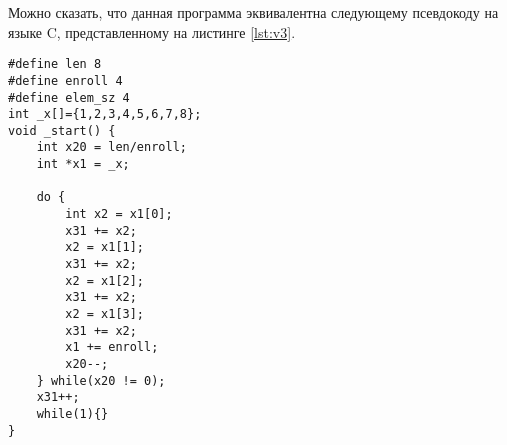 \clearpage

Можно сказать, что данная программа эквивалентна следующему псевдокоду на языке C, представленному на листинге \ref{lst:v3}.

\begin{lstlisting}[label=lst:v3,caption=Псевдокод общей программы]
#define len 8
#define enroll 4
#define elem_sz 4
int _x[]={1,2,3,4,5,6,7,8};
void _start() {
	int x20 = len/enroll;
	int *x1 = _x;
	
	do {
		int x2 = x1[0];
		x31 += x2;
		x2 = x1[1];
		x31 += x2;
		x2 = x1[2];
		x31 += x2;
		x2 = x1[3];
		x31 += x2;
		x1 += enroll;
		x20--;
	} while(x20 != 0);
	x31++;
	while(1){}
}
\end{lstlisting}


